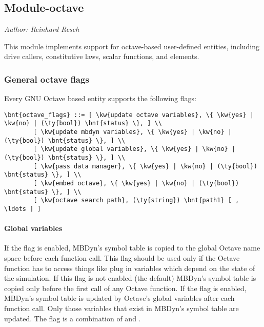 \subsection{Module-octave}
\emph{Author: Reinhard Resch}

\noindent
This module implements support for octave-based user-defined entities, including
drive callers, constitutive laws, scalar functions, and elements.

\subsubsection{General octave flags}
Every GNU Octave based entity supports the following flags:
\begin{Verbatim}[commandchars=\\\{\}]
    \bnt{octave_flags} ::= [ \kw{update octave variables}, \{ \kw{yes} | \kw{no} | (\ty{bool}) \bnt{status} \}, ] \\
        [ \kw{update mbdyn variables}, \{ \kw{yes} | \kw{no} | (\ty{bool}) \bnt{status} \}, ] \\
        [ \kw{update global variables}, \{ \kw{yes} | \kw{no} | (\ty{bool}) \bnt{status} \}, ] \\
        [ \kw{pass data manager}, \{ \kw{yes} | \kw{no} | (\ty{bool}) \bnt{status} \}, ] \\
        [ \kw{embed octave}, \{ \kw{yes} | \kw{no} | (\ty{bool}) \bnt{status} \}, ] \\
        [ \kw{octave search path}, (\ty{string}) \bnt{path1} [ , \ldots ] ]
\end{Verbatim}
\paragraph{Global variables}
If the flag  is enabled, MBDyn's symbol table is copied to the global Octave name space before each function call.
This flag should be used only if the Octave function has to access things like plug in variables which depend on the state of the simulation.
If this flag is not enabled (the default) MBDyn's symbol table is copied only before the first call of any Octave function.
If the flag  is enabled, MBDyn's symbol table is updated by Octave's global variables after each function call.
Only those variables that exist in MBDyn's symbol table are updated.
The flag  is a combination of  and .

